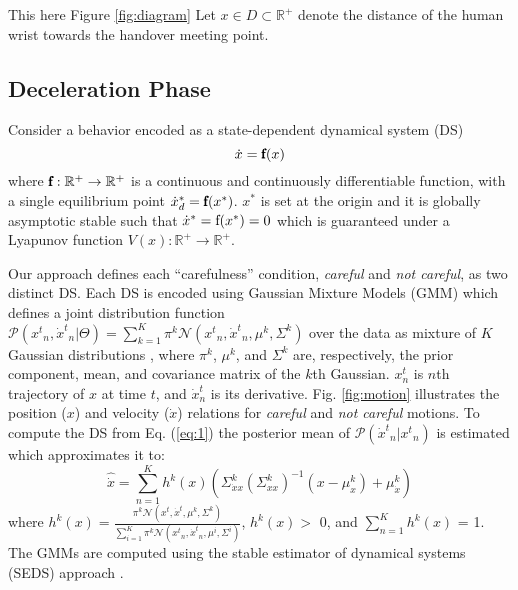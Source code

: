 This here Figure \ref{fig:diagram}
Let $x \in D \subset \mathbb{R}^{+}$ denote the distance of the human wrist towards the handover meeting point. 

\subsection{Deceleration Phase}

Consider a behavior encoded as a state-dependent dynamical system (DS)
%
\begin{equation}
\dot{x} = \pmb{\textnormal{f}}(x)
\label{eq:1}
\end{equation}
where $\pmb{\textnormal{f}}:\mathbb{R}^{+} \to \mathbb{R}^{+}$ is a continuous and continuously differentiable function, with a single equilibrium point ${\dot{x}_d}^* = \pmb{\textnormal{f}}(x^*)$. $x^{*}$ is set at the origin and it is globally asymptotic stable such that $\dot{x}^* = \textnormal{f}(x^{*}) = 0$ which is guaranteed under a Lyapunov function $V(x):\mathbb{R}^{+} \rightarrow \mathbb{R}^{+}$.

Our approach defines each ``carefulness'' condition, \textit{careful} and \textit{not careful}, as two distinct DS. Each DS is encoded using Gaussian Mixture Models (GMM) which defines a joint distribution function $\mathcal{P}({{x}^{t}}_n, {\dot{x}^{t}}_n | \Theta) = \sum_{k=1}^{K} \pi^{k} \mathcal{N}({{x}^{t}}_n, {\dot{x}^{t}}_n, \mu^{k}, \Sigma^{k})$ over the data as mixture of $K$ Gaussian distributions \cite{khansari2011learning}, where $\pi^{k}$, $\mu^{k}$, and $\Sigma^{k}$ are, respectively, the prior component, mean, and covariance matrix of the $k$th Gaussian. $x_n^t$ is $n$th trajectory of $x$ at time $t$, and $\dot{x}_n^t$ is its derivative. Fig. \ref{fig:motion} illustrates the position ($x$) and velocity ($\dot{x}$) relations for \textit{careful} and \textit{not careful} motions. To compute the DS from Eq. (\ref{eq:1}) the posterior mean of $\mathcal{P}({\dot{x}^{t}}_n|{{x}^{t}}_n)$ is estimated which approximates it to:
%
\begin{equation}
\hat{\dot{x}} = \sum_{n=1}^{K} h^{k}(x) (\Sigma^{k}_{\dot{x}x}(\Sigma^{k}_{xx})^{-1} (x - \mu^{k}_{x}) + \mu^{k}_{\dot{x}})
\label{eq:2}
\end{equation}
where $h^{k}(x) = \frac{\pi^{k} \mathcal{N}({{x}^{t}}, {\dot{x}^{t}}, \mu^{k}, \Sigma^{k})}{\sum_{i=1}^{K} \pi^{k} \mathcal{N}({{x}^{t}}_n, {\dot{x}^{t}}_n, \mu^{i}, \Sigma^{i})}$, $h^{k}(x) > $ 0, and $\sum_{n=1}^{K} h^{k}(x)$ = 1. The GMMs are computed using the stable estimator of dynamical systems (SEDS) approach \cite{khansari2011learning}. 

